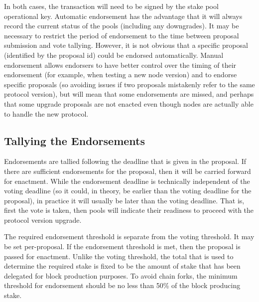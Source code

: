 In both cases, the transaction will need to be signed by the stake pool operational key.  Automatic endorsement has the advantage that it will always record the
current status of the pools (including any downgrades).  It may be necessary to restrict the period of endorsement to the time between proposal submission and vote tallying.
However, it is not obvious that a specific proposal (identified by the proposal id) could be endorsed automatically.  Manual endorsement allows endorsers to have better control over the timing of their
endorsement (for example, when testing a new node version) and to endorse specific proposals (so avoiding issues if two proposals mistakenly refer to the same protocol version),
but will mean that some endorsements are missed, and perhaps that some upgrade proposals are not enacted even though nodes are actually able to handle the new protocol.

\subsection{Tallying the Endorsements}

Endorsements are tallied following the deadline that is given in the proposal.  If there are sufficient endorsements for the proposal, then it will be carried forward
for enactment.  While the endorsement deadline is technically independent of the voting deadline (so it could, in theory, be earlier than the voting deadline for the proposal),
in practice it will usually be later than the voting deadline. That is, first the vote is taken, then pools will indicate their readiness to proceed with the protocol version
upgrade.

The required endorsement threshold is separate from the voting threshold.  It may be set per-proposal.  If the endorsement threshold is met, then the proposal is passed
for enactment.  Unlike the voting threshold, the total that is used to determine the required stake is fixed to be the amount of stake that has been delegated for block production purposes.
To avoid chain forks, the minimum threshold for endorsement should be no less than 50\% of the block producing stake.
